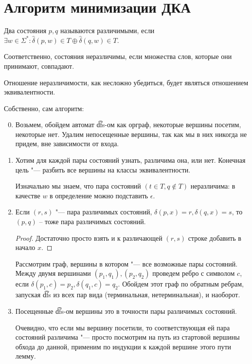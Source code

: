 \section{Алгоритм минимизации ДКА}
\begin{Def}
Два состояния $p, q$ называются различимыми, если $\exists w \in \Sigma^*: \hat \delta(p,  w) \in T \oplus \hat \delta(q, w) \in T$.

Соответственно, состояния неразличимы, если множества слов, которые они принимают, совпадают.
\end{Def}
\begin{Rem}
Отношение неразличимости, как несложно убедиться, будет являться отношением эквивалентности.
\end{Rem}

Собственно, сам алгоритм:
\begin{enumerate}
\setcounter{enumi}{-1}
\item
Возьмем, обойдем автомат \t{dfs}-ом как орграф, некоторые вершины посетим, некоторые нет. 
Удалим непосещенные вершины, так как мы в них никогда не придем, вне зависимости от входа.

\item
Хотим для каждой пары состояний узнать, различима она, или нет. Конечная цель "--- разбить все вершины на классы эквивалентности.

Изначально мы знаем, что пара состояний $(t \in T, q \notin T)$ неразличима: в качестве $w$ в определение можно подставить $\epsilon$.

\item
\begin{lemma}
Если $(r, s)$ "--- пара различимых состояний, $\delta(p, x) = r, \delta(q, x) = s$, то $(p, q)$ -- тоже пара различимых состояний.
\end{lemma}
\begin{proof}
Достаточно просто взять и к различающей $(r, s)$ строке добавить в начало $x$.
\end{proof}

Рассмотрим граф, вершины в котором "--- все возможные пары состояний. Между двумя вершинами $(p_1, q_1), (p_2, q_2)$ проведем ребро с символом $c$, если $\delta(p_1, c) = p_2, \delta(q_1, c) = q_2$.
Обойдем этот граф по обратным ребрам, запуская \t{dfs} из всех пар вида (терминальная, нетерминальная), и наоборот.

\item
Посещенные \t{dfs}-ом вершины это в точности пары различимых состояний. 

Очевидно, что если мы вершину посетили, то соответствующая ей пара состояний различима "--- просто посмотрим на путь из стартовой вершины обхода до данной, применим по индукции к каждой вершине этого пути лемму.


\end{enumerate}
